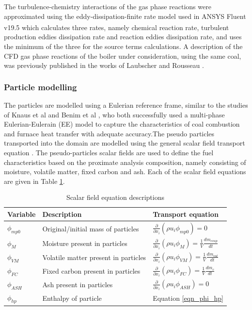 \documentclass[review]{elsarticle}
\begin{document}
The turbulence-chemistry interactions of the gas phase reactions were approximated using the eddy-dissipation-finite rate model used in ANSYS Fluent v19.5\textsuperscript{\textregistered} which calculates three rates, namely chemical reaction rate, turbulent production eddies dissipation rate and reaction eddies dissipation rate, and uses the minimum of the three for the source terms calculations. A description of the CFD gas phase reactions of the boiler under consideration, using the same coal, was previously published in the works of Laubscher and Rousseau \cite{Laubscher2019b}.

\subsubsection{Particle modelling}
The particles are modelled using a Eulerian reference frame, similar to the studies of Knaus et al \cite{Knaus2001a} and Benim et al \cite{Benim2005}, who both successfully used a multi-phase Eulerian-Eulerain (EE) model to capture the characteristics of coal combustion and furnace heat transfer with adequate accuracy.The pseudo particles transported into the domain are modelled using the general scalar field transport equation \cite{Versteeg2007}. The pseudo-particles scalar fields are used to define the fuel characteristics based on the proximate analysis composition, namely consisting of moisture, volatile matter, fixed  carbon and ash. Each of the scalar field equations are given in Table \ref{tab_scalars}.

\begin{table}[h!]
\centering
\caption{Scalar field equation descriptions}\label{tab_scalars}  
\vspace{2mm}     
\begin{tabular}{lll}
\hline
Variable &Description& Transport equation \\
\hline
$\phi_{mp0}$ &Original/initial mass of particles& $\frac{\partial}{\partial x_{i}}(\rho u_{i} \phi_{mp0})=0$\\
$\phi_{M}$&Moisture present in particles&$\frac{\partial}{\partial x_{i}}(\rho u_{i} \phi_{M})=\frac{1}{V} \frac{dm_{evap}}{dt}$\\
$\phi_{VM}$&Volatile matter present in particles&  $\frac{\partial}{\partial x_{i}}(\rho u_{i} \phi_{VM})=\frac{1}{V}\frac{dm_{vol}}{dt}$\\
$\phi_{FC}$&Fixed carbon present in particles&$\frac{\partial}{\partial x_{i}}(\rho u_{i} \phi_{FC})=\frac{1}{V}\frac{dm_c}{dt}$\\
$\phi_{ASH}$&Ash present in particles&$\frac{\partial}{\partial x_{i}}(\rho u_{i} \phi_{ASH})=0$\\
$\phi_{hp}$&Enthalpy of particle&Equation \eqref{eqn_phi_hp}\\
\hline
\end{tabular}
\end{table}
\end{document}
